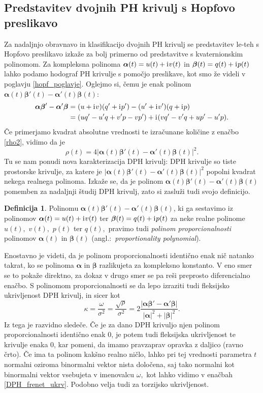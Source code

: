 \documentclass[12pt,a4paper,twoside]{article}
\newcommand{\iu}{\mathrm{i}\mkern1mu} %
\theoremstyle{definition} %
\newtheorem{definicija}{Definicija}[section]
\theoremstyle{plain} %
\theoremstyle{primerstyle}
\numberwithin{equation}{section}  %
\newcommand{\balpha}{\boldsymbol \alpha}
\newcommand{\bbeta}{\boldsymbol \beta}
\begin{document}
\subsection{Predstavitev dvojnih PH krivulj s Hopfovo preslikavo}

Za nadaljnjo obravnavo in klasifikacijo dvojnih PH krivulj se predstavitev le-teh s Hopfovo preslikavo izkaže za bolj primerno od predstavitve s kvaternionskim polinomom. Za kompleksna polinoma $\balpha(t)=u(t)+\iu v(t)$ in $\bbeta(t)=q(t)+\iu p(t)$ lahko podamo hodograf PH krivulje s pomočjo preslikave, kot smo že videli v poglavju \ref{hopf_poglavje}. Oglejmo si, čemu je enak polinom $\balpha(t)\bbeta'(t)-\balpha'(t)\bbeta(t):$
\begin{align}
	\balpha\bbeta'-\balpha'\bbeta&=(u+\iu v)(q'+\iu p')-(u'+\iu v')(q+\iu p) \nonumber \\
	&=(uq'-u'q+v'p-vp')+\iu(vq'-v'q+up'-u'p).
\end{align}
Če primerjamo kvadrat absolutne vrednosti te izračunane količine z enačbo \eqref{rho2}, vidimo da je
\begin{equation}
	\label{rho_propoly}
	\rho(t)=4|\balpha(t)\bbeta'(t)-\balpha'(t)\bbeta(t)|^2.
\end{equation}
Tu se nam ponudi nova karakterizacija DPH krivulj: DPH krivulje so tiste prostorske krivulje, za katere je $|\balpha(t)\bbeta'(t)-\balpha'(t)\bbeta(t)|^2$ popolni kvadrat nekega realnega polinoma. Izkaže se, da je polinom $\balpha(t)\bbeta'(t)-\balpha'(t)\bbeta(t)$ pomemben za nadaljnji študij DPH krivulj, zato si zasluži tudi svojo definicijo.
\begin{definicija}
	Polinomu $\balpha(t)\bbeta'(t)-\balpha'(t)\bbeta(t)$, ki ga sestavimo iz polinomov $\balpha(t)=u(t)+\iu v(t)$ ter $\bbeta(t)=q(t)+\iu p(t)$ za neke realne polinome $u(t),$ $v(t),$ $p(t)$ ter $q(t),$ pravimo tudi \emph{polinom proporcionalnosti} polinomov $\balpha(t)$ in $\bbeta(t)$ (angl.:\ \emph{proportionality polynomial}).
\end{definicija}
Enostavno je videti, da je polinom proporcionalnosti identično enak nič natanko takrat, ko se polinoma $\balpha$ in $\bbeta$ razlikujeta za kompleksno konstanto. V eno smer se to pokaže direktno, za dokaz v drugo smer se pa reši preprosto diferencialno enačbo.
S polinomom proporcionalnosti se da lepo izraziti tudi fleksijsko ukrivljenost DPH krivulj, in sicer kot
\begin{equation}
	\label{kappa_propoly}
	\kappa=\frac{\omega}{\sigma^2}=\frac{\sqrt{\rho}}{\sigma^2}=2\frac{|\balpha\bbeta'-\balpha'\bbeta|}{|\balpha|^2+|\bbeta|^2}.
\end{equation}
Iz tega je razvidno sledeče. Če je za dano DPH krivuljo njen polinom proporcionalnosti identično enak 0, je potem tudi fleksijska ukrivljenost te krivulje enaka 0, kar pomeni, da imamo pravzaprav opravka z daljico (ravno črto). Če ima ta polinom kakšno realno ničlo, lahko pri tej vrednosti parametra $t$ normalni oziroma binormalni vektor nista določena, saj tako normalni kot binormalni vektor vsebujeta v imenovalcu $\omega,$ kot lahko vidimo v enačbah \eqref{DPH_frenet_ukrv}. Podobno velja tudi za torzijsko ukrivljenost.
\end{document}

